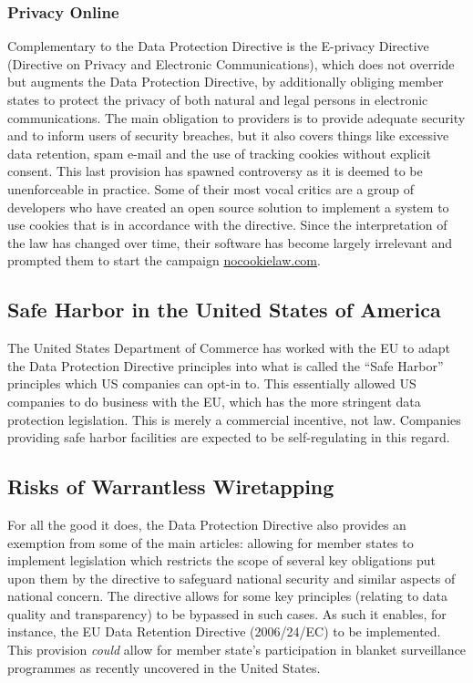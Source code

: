 \documentclass[12pt]{article}
\begin{document}
\subsubsection{Privacy Online}
Complementary to the Data Protection Directive is the E-privacy Directive (Directive on Privacy and Electronic Communications), which does not override but augments the Data Protection Directive, by additionally obliging member states to protect the privacy of both natural and legal persons in electronic communications.
The main obligation to providers is to provide adequate security and to inform users of security breaches, but it also covers things like excessive data retention, spam e-mail and the use of tracking cookies without explicit consent.
This last provision has spawned controversy as it is deemed to be unenforceable in practice.
Some of their most vocal critics are a group of developers who have created an open source solution to implement a system to use cookies that is in accordance with the directive.
Since the interpretation of the law has changed over time, their software has become largely irrelevant and prompted them to start the campaign \url{nocookielaw.com}.


\subsection{Safe Harbor in the United States of America}
The United States Department of Commerce has worked with the EU to adapt the Data Protection Directive principles into what is called the ``Safe Harbor'' principles which US companies can opt-in to.
This essentially allowed US companies to do business with the EU, which has the more stringent data protection legislation.
This is merely a commercial incentive, not law.
Companies providing safe harbor facilities are expected to be self-regulating in this regard.

\subsection{Risks of Warrantless Wiretapping}
For all the good it does, the Data Protection Directive also provides an exemption from some of the main articles: allowing for member states to implement legislation which restricts the scope of several key obligations put upon them by the directive to safeguard national security and similar aspects of national concern.
The directive allows for some key principles (relating to data quality and transparency) to be bypassed in such cases.
As such it enables, for instance, the EU Data Retention Directive (2006/24/EC) to be implemented.
This provision \textit{could} allow for member state's participation in blanket surveillance programmes as recently uncovered in the United States.
\end{document}
